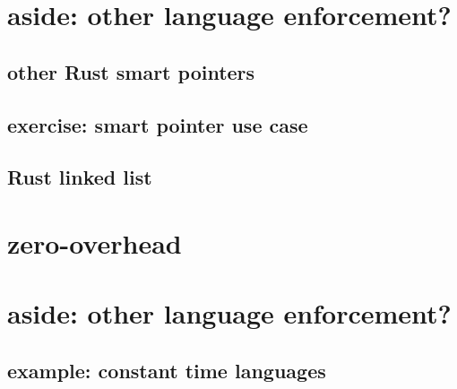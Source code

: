 \section{aside: other language enforcement?}



\subsection{other Rust smart pointers}


\subsection{exercise: smart pointer use case}


\subsection{Rust linked list}


\section{zero-overhead}


\section{aside: other language enforcement?}


\subsection{example: constant time languages}


